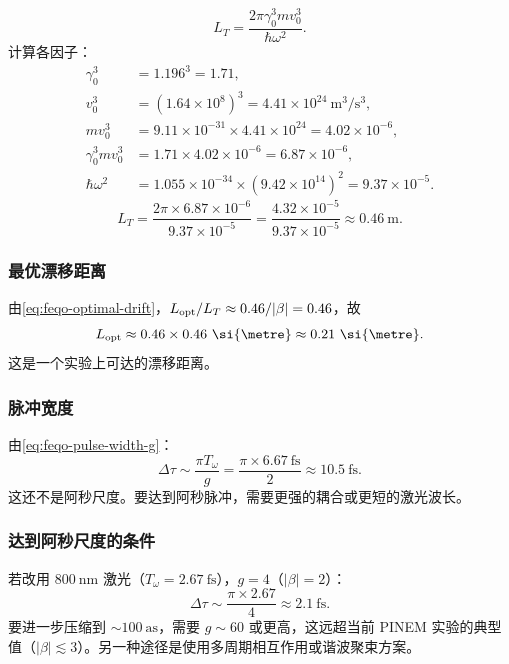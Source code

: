 \begin{equation}
L_T=\frac{2\pi\gamma_0^3mv_0^3}{\hbar\omega^2}.
\end{equation}
计算各因子：
\begin{align}
\gamma_0^3&=1.196^3=1.71,\\
v_0^3&=(1.64\times10^8)^3=4.41\times10^{24}\ \si{\metre\cubed\per\second\cubed},\\
mv_0^3&=9.11\times10^{-31}\times4.41\times10^{24}=4.02\times10^{-6},\\
\gamma_0^3 mv_0^3&=1.71\times4.02\times10^{-6}=6.87\times10^{-6},\\
\hbar\omega^2&=1.055\times10^{-34}\times(9.42\times10^{14})^2=9.37\times10^{-5}.
\end{align}
\begin{equation}
L_T=\frac{2\pi\times6.87\times10^{-6}}{9.37\times10^{-5}}=\frac{4.32\times10^{-5}}{9.37\times10^{-5}}\approx 0.46\ \si{\metre}.
\label{eq:feqo-talbot-100keV}
\end{equation}

\subsubsection{最优漂移距离}

由\cref{eq:feqo-optimal-drift}，$L_{\rm opt}/L_T\approx 0.46/|\beta|=0.46$，故
\begin{equation}
L_{\rm opt}\approx 0.46\times0.46\ \si{\metre}\approx 0.21\ \si{\metre}.
\label{eq:feqo-optimal-100keV}
\end{equation}
这是一个实验上可达的漂移距离。

\subsubsection{脉冲宽度}

由\cref{eq:feqo-pulse-width-g}：
\begin{equation}
\Delta\tau\sim\frac{\pi T_\omega}{g}=\frac{\pi\times6.67\ \si{\femto\second}}{2}\approx 10.5\ \si{\femto\second}.
\label{eq:feqo-pulse-width-100keV}
\end{equation}
这还不是阿秒尺度。要达到阿秒脉冲，需要更强的耦合或更短的激光波长。

\subsubsection{达到阿秒尺度的条件}

若改用 $800\ \si{\nano\metre}$ 激光（$T_\omega=2.67\ \si{\femto\second}$），$g=4$（$|\beta|=2$）：
\begin{equation}
\Delta\tau\sim\frac{\pi\times2.67}{4}\approx 2.1\ \si{\femto\second}.
\end{equation}
要进一步压缩到 $\sim 100\ \si{\atto\second}$，需要 $g\sim 60$ 或更高，这远超当前 PINEM 实验的典型值（$|\beta|\lesssim 3$）。另一种途径是使用多周期相互作用或谐波聚束方案。

